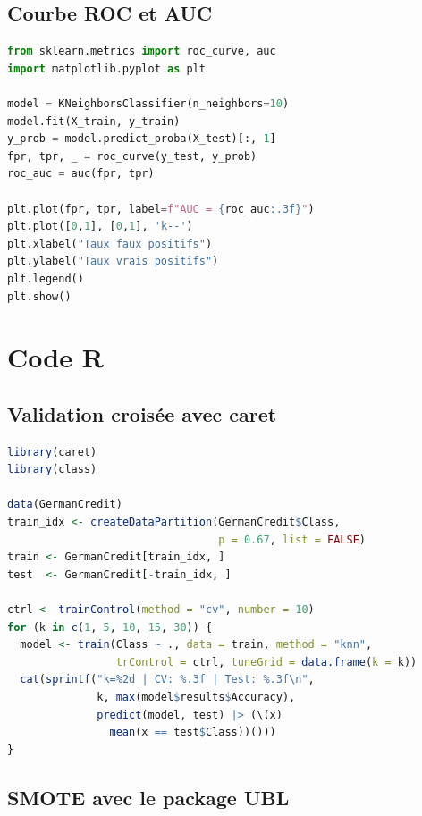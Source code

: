 \documentclass[a4paper,11pt]{article}
\theoremstyle{definition}
\theoremstyle{remark}
\begin{document}
\subsection{Courbe ROC et AUC}

\begin{lstlisting}[language=Python]
from sklearn.metrics import roc_curve, auc
import matplotlib.pyplot as plt

model = KNeighborsClassifier(n_neighbors=10)
model.fit(X_train, y_train)
y_prob = model.predict_proba(X_test)[:, 1]
fpr, tpr, _ = roc_curve(y_test, y_prob)
roc_auc = auc(fpr, tpr)

plt.plot(fpr, tpr, label=f"AUC = {roc_auc:.3f}")
plt.plot([0,1], [0,1], 'k--')
plt.xlabel("Taux faux positifs")
plt.ylabel("Taux vrais positifs")
plt.legend()
plt.show()
\end{lstlisting}

\section{Code R}

\subsection{Validation crois\'ee avec caret}

\begin{lstlisting}[language=R]
library(caret)
library(class)

data(GermanCredit)
train_idx <- createDataPartition(GermanCredit$Class,
                                 p = 0.67, list = FALSE)
train <- GermanCredit[train_idx, ]
test  <- GermanCredit[-train_idx, ]

ctrl <- trainControl(method = "cv", number = 10)
for (k in c(1, 5, 10, 15, 30)) {
  model <- train(Class ~ ., data = train, method = "knn",
                 trControl = ctrl, tuneGrid = data.frame(k = k))
  cat(sprintf("k=%2d | CV: %.3f | Test: %.3f\n",
              k, max(model$results$Accuracy),
              predict(model, test) |> (\(x)
                mean(x == test$Class))()))
}
\end{lstlisting}

\subsection{SMOTE avec le package UBL}
\end{document}

